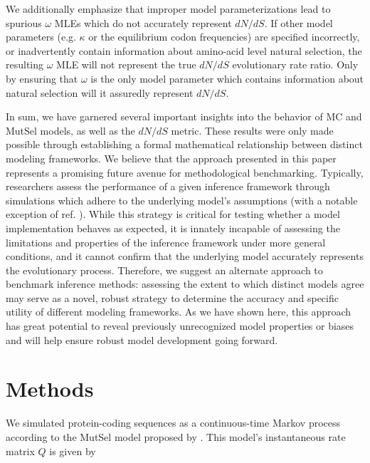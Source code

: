 \documentclass{pnastwo}
\begin{document}
\begin{article}
We additionally emphasize that improper model parameterizations lead to spurious $\omega$ MLEs which do not accurately represent $dN/dS$. If other model parameters (e.g. $\kappa$ or the equilibrium codon frequencies) are specified incorrectly, or inadvertently contain information about amino-acid level natural selection, the resulting $\omega$ MLE will not represent the true $dN/dS$ evolutionary rate ratio. Only by ensuring that $\omega$ is the only model parameter which contains information about natural selection will it assuredly represent $dN/dS$. 

In sum, we have garnered several important insights into the behavior of MC and MutSel models, as well as the $dN/dS$ metric. These results were only made possible through establishing a formal mathematical relationship between distinct modeling frameworks. We believe that the approach presented in this paper represents a promising future avenue for methodological benchmarking. Typically, researchers assess the performance of a given inference framework through simulations which adhere to the underlying model's assumptions (with a notable exception of ref. \cite{Holder2008}). While this strategy is critical for testing whether a model implementation behaves as expected, it is innately incapable of assessing the limitations and properties of the inference framework under more general conditions, and it cannot confirm that the underlying model accurately represents the evolutionary process. Therefore, we suggest an alternate approach to benchmark inference methods: assessing the extent to which distinct models agree may serve as a novel, robust strategy to determine the accuracy and specific utility of different modeling frameworks. As we have shown here, this approach has great potential to reveal previously unrecognized model properties or biases and will help ensure robust model development going forward.


\section*{Methods}

We simulated protein-coding sequences as a continuous-time Markov process \cite{Yang2006} according to the MutSel model proposed by \cite{HalpernBruno1998}. This model's instantaneous rate matrix $Q$ is given by 


\end{article}
\end{document}
